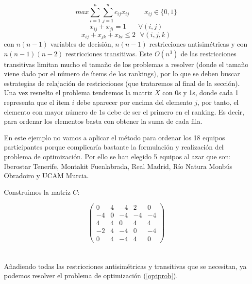 \begin{equation} \label{optprob}
	max \sum_{i=1}^{n} \sum_{j=1}^{n} c_{ij} x_{ij} \ \ \ \ \ \ \ \ \ \ x_{ij} \in \{0,1\} 
\end{equation}
\begin{equation*}
	x_{ij} + x_{ji} = 1 \ \ \ \ \ \ \ \ \forall (i,j)
\end{equation*}
\begin{equation*}
	x_{ij} + x_{jk} + x_{ki} \leq 2 \ \ \ \forall (i,j,k)
\end{equation*}
con $n(n-1)$ variables de decisión, $n(n-1)$ restricciones antisimétricas y con $n(n-1)(n-2)$ restricciones transitivas. Este $O(n^{3})$ de las restricciones transitivas limitan mucho el tamaño de los problemas a resolver (donde el tamaño viene dado por el número de ítems de los rankings), por lo que se deben buscar estrategias de relajación de restricciones (que trataremos al final de la sección).\\

Una vez resuelto el problema tendremos la matriz $X$ con 0s y 1s, donde cada 1 representa que el ítem $i$ debe aparecer por encima del elemento $j$, por tanto, el elemento con mayor número de 1s debe de ser el primero en el ranking. Es decir, para ordenar los elementos basta con obtener la suma de cada fila.\\   
 
\begin{ejem} En este ejemplo no vamos a aplicar el método para ordenar los 18 equipos participantes porque complicaría bastante la formulación y realización del problema de optimización. Por ello se han elegido 5 equipos al azar que son: Iberostar Tenerife, Montakit Fuenlabrada, Real Madrid, Río Natura Monbús Obradoiro y UCAM Murcia.
\end{ejem}	
Construimos la matriz $C$:

\[	
	\left( \begin{array}{ccccc}
		0 & 4 & -4 & 2 & 0\\
		-4 & 0 & -4 & -4 & -4\\
		4 & 4 & 0 & 4 & 4\\
		-2 & 4 & -4 & 0 & -4\\
		0 & 4 & -4 & 4 & 0
	\end{array} \right) 
\]	
\ \\  \ \\
Añadiendo todas las restricciones antisimétricas y transitivas que se necesitan, ya podemos resolver el problema de optimización (\ref{optprob}).\\

